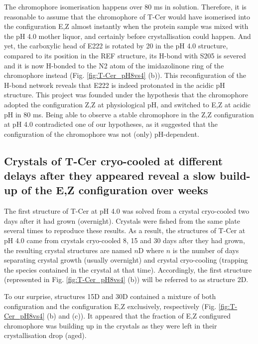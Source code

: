\vspace{2mm}

The chromophore isomerisation happens over 80 ms in solution. Therefore, it is reasonable to assume that the chromophore of T-Cer would have isomerised into the configuration E,Z almost instantly when the protein sample was mixed with the pH 4.0 mother liquor, and certainly before crystallisation could happen. And yet, the carboxylic head of E222 is rotated by 20 \degree in the pH 4.0 structure, compared to its position in the REF structure, its H-bond with S205 is severed and it is now H-bonded to the N2 atom of the imidazolinone ring of the chromophore instead (Fig. \ref{fig:T-Cer_pH8vs4} (b)). This reconfiguration of the H-bond network reveals that E222 is indeed protonated in the acidic pH structure. 
This project was founded under the hypothesis that the chromophore adopted the configuration Z,Z at physiological pH, and switched to E,Z at acidic pH in 80 ms. Being able to observe a stable chromophore in the Z,Z configuration at pH 4.0 contradicted one of our hypotheses, as it suggested that the configuration of the chromophore was not (only) pH-dependent. 

\subsection{Crystals of T-Cer cryo-cooled at different delays after they appeared reveal a slow build-up of the E,Z configuration over weeks}

The first structure of T-Cer at pH 4.0 was solved from a crystal cryo-cooled two days after it had grown (overnight). Crystals were fished from the same plate several times to reproduce these results. As a result, the structures of T-Cer at pH 4.0 came from crystals cryo-cooled 8, 15 and 30 days after they had grown, the resulting crystal structures are named \(n\)D where \(n\) is the number of days separating crystal growth (usually overnight) and crystal cryo-cooling (trapping the species contained in the crystal at that time). Accordingly, the first structure (represented in Fig. \ref{fig:T-Cer_pH8vs4} (b)) will be referred to as structure 2D. 

To our surprise, structures 15D and 30D contained a mixture of both configuration and the configuration E,Z exclusively, respectively (Fig. \ref{fig:T-Cer_pH8vs4} (b) and (c)). It appeared that the fraction of E,Z configured chromophore was building up in the crystals as they were left in their crystallisation drop (aged).  

